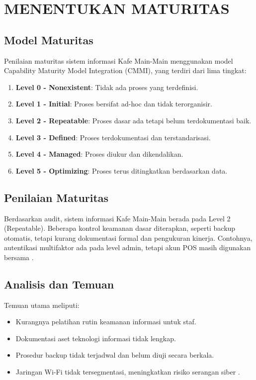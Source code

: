 \documentclass[12pt, a4paper]{report}
\begin{document}
\chapter{MENENTUKAN MATURITAS}
\label{bab:maturitas}

\section{Model Maturitas}
Penilaian maturitas sistem informasi Kafe Main-Main menggunakan model Capability Maturity Model Integration (CMMI), yang terdiri dari lima tingkat:
\begin{enumerate}
    \item \textbf{Level 0 - Nonexistent}: Tidak ada proses yang terdefinisi.
    \item \textbf{Level 1 - Initial}: Proses bersifat ad-hoc dan tidak terorganisir.
    \item \textbf{Level 2 - Repeatable}: Proses dasar ada tetapi belum terdokumentasi baik.
    \item \textbf{Level 3 - Defined}: Proses terdokumentasi dan terstandarisasi.
    \item \textbf{Level 4 - Managed}: Proses diukur dan dikendalikan.
    \item \textbf{Level 5 - Optimizing}: Proses terus ditingkatkan berdasarkan data.
\end{enumerate}

\section{Penilaian Maturitas}
Berdasarkan audit, sistem informasi Kafe Main-Main berada pada Level 2 (Repeatable). Beberapa kontrol keamanan dasar diterapkan, seperti backup otomatis, tetapi kurang dokumentasi formal dan pengukuran kinerja. Contohnya, autentikasi multifaktor ada pada level admin, tetapi akun POS masih digunakan bersama \citep{widodo2022keamanan, sari2023backup}.

\section{Analisis dan Temuan}
Temuan utama meliputi:
\begin{itemize}
    \item Kurangnya pelatihan rutin keamanan informasi untuk staf.
    \item Dokumentasi aset teknologi informasi tidak lengkap.
    \item Prosedur backup tidak terjadwal dan belum diuji secara berkala.
    \item Jaringan Wi-Fi tidak tersegmentasi, meningkatkan risiko serangan siber \citep{haryanto2021wifi}.
\end{itemize}
\end{document}
